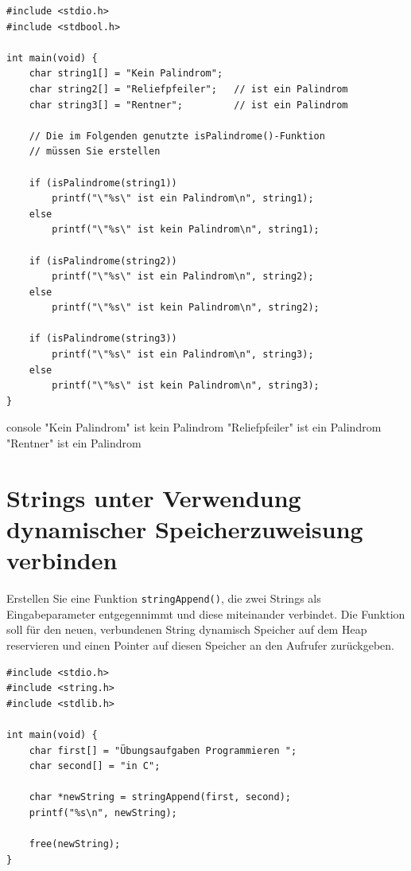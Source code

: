 \Vorlage
\begin{verbatim}
#include <stdio.h>
#include <stdbool.h>

int main(void) {
    char string1[] = "Kein Palindrom";
    char string2[] = "Reliefpfeiler";   // ist ein Palindrom
    char string3[] = "Rentner";         // ist ein Palindrom

    // Die im Folgenden genutzte isPalindrome()-Funktion
    // müssen Sie erstellen

    if (isPalindrome(string1))
        printf("\"%s\" ist ein Palindrom\n", string1);
    else
        printf("\"%s\" ist kein Palindrom\n", string1);

    if (isPalindrome(string2))
        printf("\"%s\" ist ein Palindrom\n", string2);
    else
        printf("\"%s\" ist kein Palindrom\n", string2);

    if (isPalindrome(string3))
        printf("\"%s\" ist ein Palindrom\n", string3);
    else
        printf("\"%s\" ist kein Palindrom\n", string3);
}
\end{verbatim}

\begin{mybox}[Bildschirmausgabe]{console}
"Kein Palindrom" ist kein Palindrom
"Reliefpfeiler" ist ein Palindrom
"Rentner" ist ein Palindrom
\end{mybox}




\chapter{Strings unter Verwendung dynamischer Speicherzuweisung verbinden}

\vspace{10pt}

Erstellen Sie eine Funktion \texttt{stringAppend()}, die zwei Strings als
Eingabeparameter entgegennimmt und diese miteinander verbindet. Die Funktion
soll für den neuen, verbundenen String dynamisch Speicher auf dem Heap
reservieren und einen Pointer auf diesen Speicher an den Aufrufer zurückgeben.

\Vorlage
\begin{verbatim}
#include <stdio.h>
#include <string.h>
#include <stdlib.h>

int main(void) {
    char first[] = "Übungsaufgaben Programmieren ";
    char second[] = "in C";

    char *newString = stringAppend(first, second);
    printf("%s\n", newString);

    free(newString);
}
\end{verbatim}

